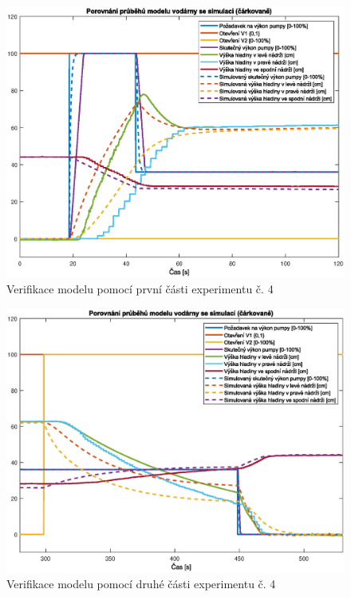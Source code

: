 \documentclass[conference]{IEEEtran}
\begin{document}
\begin{figure}[htbp]
    \centering
    \includegraphics[width=\linewidth]{verifikace_4_start.eps}
    \caption{Verifikace modelu pomocí první části experimentu č. 4}
    \label{fig:verifikace_4_start}
\end{figure}
\begin{figure}[htbp]
    \centering
    \includegraphics[width=\linewidth]{verifikace_4_end.eps}
    \caption{Verifikace modelu pomocí druhé části experimentu č. 4}
    \label{fig:verifikace_4_end}
\end{figure}

\newpage
\end{document}
